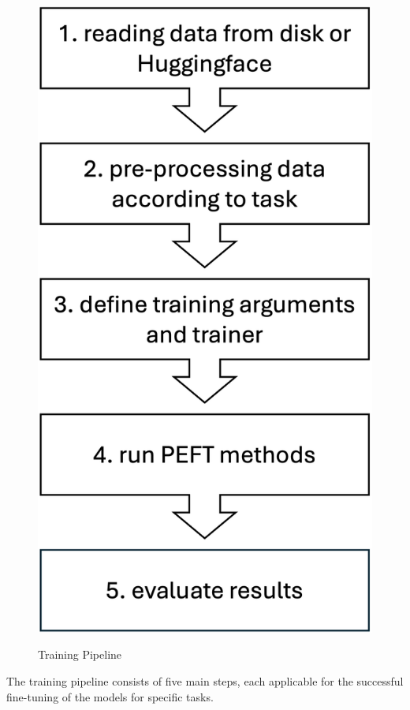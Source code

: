 \begin{figure}[ht!]
    \centering
    {\includegraphics[scale=0.5]{fig/training_pipieline.png}}
    \caption{Training Pipeline}
    \label{fig:pipeline}
\end{figure}

The training pipeline consists of five main steps, each applicable for the successful fine-tuning of the models for specific tasks. 

